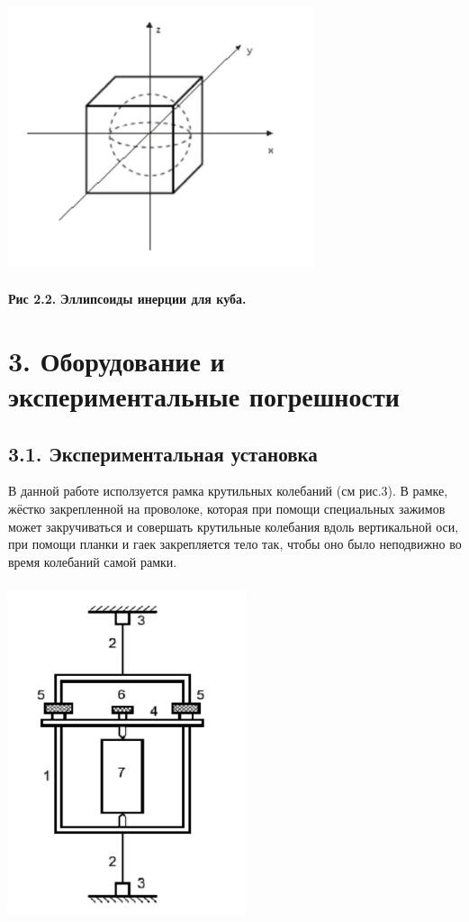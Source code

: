 \begin{center}
\includegraphics[width=9cm, height=8cm]{iner_cube.jpeg}
\end{center}

\begin{flushright}
{\scriptsize \textbf{Рис 2.2.} \textbf {Эллипсоиды инерции для куба.}}
\end{flushright}


\section*{3. Оборудование и экспериментальные погрешности}

\subsection*{3.1. Экспериментальная установка}

    В данной работе исползуется рамка крутильных колебаний (см рис.3). В рамке, жёстко закрепленной на проволоке, которая при помощи специальных зажимов может закручиваться и совершать крутильные колебания вдоль вертикальной оси, при помощи планки и гаек закрепляется тело так, чтобы оно было неподвижно во время колебаний самой рамки.
    
\begin{center}
\includegraphics[width=7cm, height=10cm]{ustanovka.jpeg}
\end{center}

